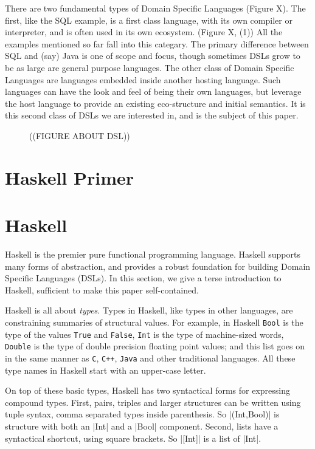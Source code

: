 \documentclass[11pt]{article}
\begin{document}
There are two fundamental types of Domain Specific Languages
(Figure X).
%
The first, like the SQL example, is a first class language,
with its own compiler or interpreter, and is often used in
its own ecosystem. (Figure X, (1)) 
All the examples mentioned so far fall
into this categary. The primary difference between SQL and
(say) Java is one of scope and focus, though sometimes
DSLs grow to be as large are general purpose languages.
%
The other class of Domain Specific Languages are languages
embedded inside another hosting language. Such languages
can have the look and feel of being their own languages,
but leverage the host language to provide an existing
eco-structure and initial semantics. It is this second
class of DSLs we are interested in, and is the subject of
this paper.

\begin{figure}
((FIGURE ABOUT DSL))

\end{figure}

\section{Haskell Primer}

\section{Haskell}

Haskell is the premier pure functional programming language.
Haskell supports many forms of abstraction, and provides
a robust foundation for building Domain Specific Languages (DSLs).
In this section, we give a terse
introduction to Haskell,
sufficient to make this paper self-contained.

Haskell is all about {\em types\/}. Types in Haskell, like
types in other languages, are constraining summaries of structural values.
For example, in Haskell \verb|Bool| is the type of the values
\verb|True| and \verb|False|, \verb|Int| is the type of machine-sized
words, \verb|Double| is the type of double precision floating
point values; and this list goes on in the same manner as
\verb|C|, \verb|C++|, \verb|Java| and other traditional languages.
All these type names in Haskell start with an upper-case letter.

On top of these basic types, Haskell has two syntactical forms for expressing
compound types.
First, pairs, triples and larger structures can be written using tuple syntax,
comma separated types inside parenthesis.
So |(Int,Bool)| is structure with both an |Int| and a |Bool| component.
Second, lists have a syntactical shortcut, using square brackets.
So |[Int]| is a list of |Int|.
\end{document}
